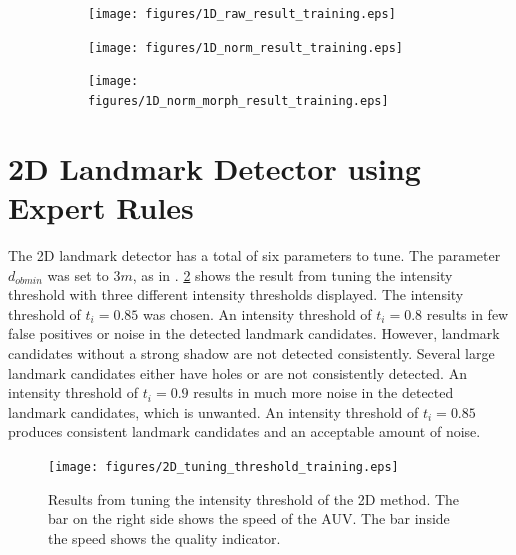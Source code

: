 \begin{figure} %
     \centering
    \begin{subfigure}[t]{0.339\textwidth}
         \centering
         \texttt{[image: figures/1D\_raw\_result\_training.eps]}
     \end{subfigure}
     \hfill
     \begin{subfigure}[t]{0.277\textwidth}
         \centering
         \texttt{[image: figures/1D\_norm\_result\_training.eps]}
     \end{subfigure}
     \hfill
     \begin{subfigure}[t]{0.371\textwidth}
         \centering
         \texttt{[image: figures/1D\_norm\_morph\_result\_training.eps]}
     \end{subfigure}
        \caption{}
        \label{}
\end{figure}

\section{2D Landmark Detector using Expert Rules}

The 2D landmark detector has a total of six parameters to tune. The parameter $d_{ob min}$ was set to $3 m $, as in \cite{Leblond2019SonarProject}. \cref{fig:2D_tuning_intensity_thres} shows the result from tuning the intensity threshold with three different intensity thresholds displayed. The intensity threshold of $t_i = 0.85$ was chosen. An intensity threshold of $t_i = 0.8$ results in few false positives or noise in the detected landmark candidates. However, landmark candidates without a strong shadow are not detected consistently. Several large landmark candidates either have holes or are not consistently detected. An intensity threshold of $t_i = 0.9$ results in much more noise in the detected landmark candidates, which is unwanted. An intensity threshold of $t_i = 0.85$ produces consistent landmark candidates and an acceptable amount of noise. 

\begin{figure}  %
  \centering
  \texttt{[image: figures/2D\_tuning\_threshold\_training.eps]}
  \caption[Results of tuning intensity threshold the 2D method]{Results from tuning the intensity threshold of the 2D method. The bar on the right side shows the speed of the AUV. The bar inside the speed shows the quality indicator. }
  \label{fig:2D_tuning_intensity_thres}
\end{figure}

